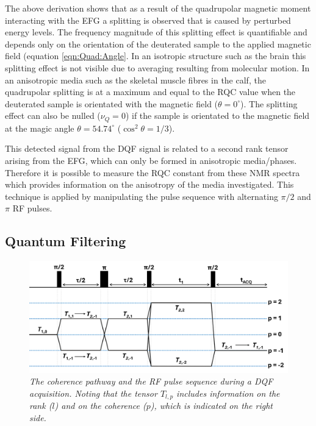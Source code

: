 The above derivation shows that as a result of the quadrupolar magnetic moment interacting with the \ac{EFG} a splitting is observed that is caused by perturbed energy levels. The frequency magnitude of this splitting effect is quantifiable and depends only on the orientation of the deuterated sample to the applied magnetic field (equation \ref{eqn:Quad:Angle}. In an isotropic structure such as the brain this splitting effect is not visible due to averaging resulting from molecular motion. In an anisotropic media such as the skeletal muscle fibres in the calf, the quadrupolar splitting is at a maximum and equal to the \ac{RQC} value when the deuterated sample is orientated with the magnetic field ($\theta = 0^\circ$). The splitting effect can also be nulled ($\nu_Q = 0$) if the sample is orientated to the magnetic field at the magic angle $\theta = 54.74^\circ$ ($\cos^2\theta=1/3$).

This detected signal from the \ac{DQF} signal is related to a second rank tensor arising from the \ac{EFG}, which can only be formed in anisotropic media/phases. Therefore it is possible to measure the \ac{RQC} constant from these NMR spectra which provides information on the anisotropy of the media investigated. This technique is applied by manipulating the pulse sequence with alternating $\pi/2$ and $\pi$ RF pulses. 

\subsection{Quantum Filtering}

\begin{figure}
    \centering
    \includegraphics[width=1\textwidth]{Figures/Quad/DQF_Coherence.png}
    \caption{\textit{The coherence pathway and the RF pulse sequence during a \ac{DQF} acquisition. Noting that the tensor $T_{l,p}$ includes information on the rank ($l$) and on the coherence ($p$), which is indicated on the right side.}}
    \label{fig:Quad:Coherence}
\end{figure}

